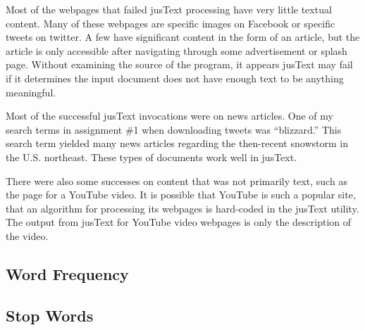 \documentclass[a4paper,12pt]{article}
\begin{document}
Most of the webpages that failed jusText processing have very little textual content. Many of these webpages
are specific images on Facebook or specific tweets on twitter. A few have significant content in the form of an
article, but the article is only accessible after navigating through some advertisement or splash page. Without
examining the source of the program, it appears jusText may fail if it determines the input document does not
have enough text to be anything meaningful.

Most of the successful jusText invocations were on news articles. One of my search terms in assignment \#1 when
downloading tweets was ``blizzard.'' This search term yielded many news articles regarding the then-recent
snowstorm in the U.S. northeast. These types of documents work well in jusText.

There were also some successes on content that was not primarily text, such as the page for a YouTube video. It
is possible that YouTube is such a popular site, that an algorithm for processing its webpages is hard-coded in
the jusText utility. The output from jusText for YouTube video webpages is only the description of the video.

\subsection{Word Frequency}

\subsection{Stop Words}

\end{document}
